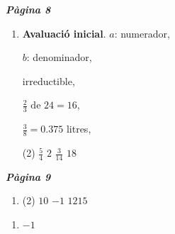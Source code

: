 \documentclass[a4paper, pdf, twoside]{book}
\begin{document}
\cleartorightpage
\renewcommand{\baselinestretch}{1.5}
\tableofcontents \cleartorightpage
\renewcommand{\baselinestretch}{1}
\def\currentname{}
\pagestyle{fancy}
\renewcommand{\headrulewidth}{0.5pt}
\fancyhead[LO,RE]{{ \fontfamily{phv}\selectfont \textit{\currentname} }}
\fancyfoot{}
\begin{multicols}{2}
\def\currentname{Solucions del Tema 1}
\vspace*{0.75cm}

 

\vspace*{0.4cm}
 {}
\vspace{0.3cm}


{\textbf{\em Pàgina 8}} \hrulefill
\begin{enumerate}
\vspace{0.25cm}
 \item[$\bullet$ ] {\selectfont\color{blue}\textbf{Avaluació inicial}. }
$a$: numerador,\par $b$: denominador,\par irreductible,\par $\frac {2}{3} \text { de } 24=16$,\par $\frac {3}{8}=0.375$ litres,\par \begin{tasks}(2) \task $\frac {5}{4}$ \task $2$ \task $\frac {3}{14}$ \task $18$ \end{tasks} 
 \end{enumerate}
\vspace{0.3cm}


{\textbf{\em Pàgina 9}} \hrulefill
\begin{enumerate}
\vspace{0.25cm}



 \item[\fontfamily{phv}\selectfont\color{blue}\textbf{1}. ] 
 \begin{tasks}[column-sep=1em, item-indent=1.3333em](2)
	 \task $10$
	 \task $-1$
	 \task $1215$
\end{tasks}
 \end{enumerate}
\begin{enumerate}
\vspace{0.25cm}
\item[\fontfamily{phv}\selectfont\color{blue}\textbf{2. }] 
$-1$
\vspace{0.25cm}



\end{enumerate}
\end{multicols}
\end{document}
